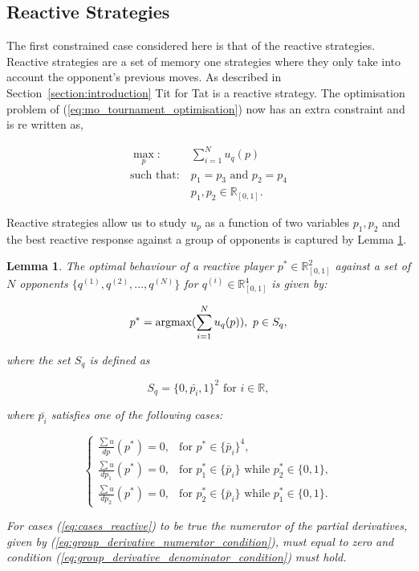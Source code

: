 \documentclass[10pt]{article}
\newcommand{\R}{\mathbb{R}}
\newtheorem{lemma}[theorem]{Lemma}
\begin{document}
\subsection{Reactive Strategies}\label{section:reactive_analytical}

The first constrained case considered here is that of the reactive strategies.
Reactive strategies are a set of memory one strategies where they only take into
account the opponent's previous moves. As described in Section~\ref{section:introduction}
Tit for Tat is a reactive strategy. The optimisation problem of (\ref{eq:mo_tournament_optimisation})
now has an extra constraint and is re written as,

\begin{equation}\label{eq:reactive_tournament_optimisation}
\begin{aligned}
\max_p: & \ \sum_{i=1} ^ N u_q(p)
\\
\text{such that}: & \ p_1 = p_3 \text{ and } p_2 = p_4\\
    & \ p_1, p_2 \in \R_{[0, 1]}.
\end{aligned}
\end{equation}

Reactive strategies allow us to study \(u_p\) as a function of two variables
\(p_1, p_2\) and the best reactive response against a group of opponents is captured by Lemma
\ref{lemma:reactive_group_best_response}.

\begin{lemma}\label{lemma:reactive_group_best_response}
    The optimal behaviour of a reactive player \(p^* \in \R_{[0, 1]} ^ 2\) against a set
    of \(N\) opponents \(\{q^{(1)}, q^{(2)}, \dots, q^{(N)} \}\) for \(q^{(i)} \in 
    \R_{[0, 1]} ^ 4\) is given by:

    \[p^* = \textnormal{argmax}(\sum\limits_{i=1} ^ N  u_q(p)), \ p \in S_q,\]
    
    where the set \(S_q\) is defined as 
    
    \[S_q = \{0, \bar{p_i}, 1 \} ^ 2 \text{ for } i \in \R,\]
    
    where \(\bar{p_i}\) satisfies one of the following cases:

    \begin{equation}\label{eq:cases_reactive}
        \left\{\begin{array}{lr}
        \frac{\sum u}{dp} (p^*) = 0, & \text{for } p^* \in \{\bar{p}_i\} ^ 4, \\
        \frac{\sum u}{dp_1} (p^*) = 0, & \text{for } p_1^* \in \{\bar{p}_i\}
        \text{ while } p_2 ^ * \in \{0, 1\},\\
        \frac{\sum u}{dp_2} (p^*) = 0, & \text{for } p_2^* \in \{\bar{p}_i\}
        \text{ while } p_1 ^ * \in \{0, 1\}.
        \end{array}\right.
    \end{equation}

    For cases (\ref{eq:cases_reactive}) to be true the numerator of the partial
    derivatives, given by (\ref{eq:group_derivative_numerator_condition}), must equal
    to zero and condition (\ref{eq:group_derivative_denominator_condition}) must hold.
\end{lemma}
\end{document}
